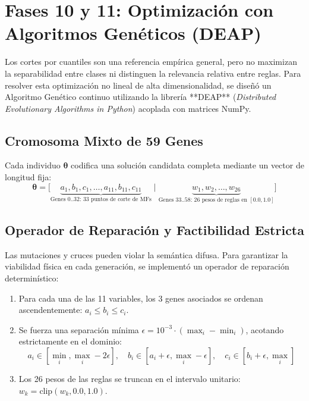 \documentclass[11pt,a4paper]{article}
\begin{document}
\section{Fases 10 y 11: Optimización con Algoritmos Genéticos (DEAP)}

Los cortes por cuantiles son una referencia empírica general, pero no maximizan la separabilidad entre clases ni distinguen la relevancia relativa entre reglas. Para resolver esta optimización no lineal de alta dimensionalidad, se diseñó un Algoritmo Genético continuo utilizando la librería **DEAP** (\textit{Distributed Evolutionary Algorithms in Python}) acoplada con matrices NumPy.

\subsection{Cromosoma Mixto de 59 Genes}
Cada individuo $\boldsymbol{\theta}$ codifica una solución candidata completa mediante un vector de longitud fija:
\begin{equation}
\boldsymbol{\theta} = \big[ \underbrace{a_1, b_1, c_1, \dots, a_{11}, b_{11}, c_{11}}_{\text{Genes 0..32: 33 puntos de corte de MFs}} \;\big\vert\; \underbrace{w_1, w_2, \dots, w_{26}}_{\text{Genes 33..58: 26 pesos de reglas en } [0.0, 1.0]} \big]
\end{equation}

\subsection{Operador de Reparación y Factibilidad Estricta}
Las mutaciones y cruces pueden violar la semántica difusa. Para garantizar la viabilidad física en cada generación, se implementó un operador de reparación determinístico:
\begin{enumerate}[noitemsep]
    \item Para cada una de las 11 variables, los 3 genes asociados se ordenan ascendentemente: $a_i \le b_i \le c_i$.
    \item Se fuerza una separación mínima $\epsilon = 10^{-3} \cdot (\max_i - \min_i)$, acotando estrictamente en el dominio:
    \begin{equation}
    a_i \in [\min_i, \max_i - 2\epsilon], \quad b_i \in [a_i + \epsilon, \max_i - \epsilon], \quad c_i \in [b_i + \epsilon, \max_i]
    \end{equation}
    \item Los 26 pesos de las reglas se truncan en el intervalo unitario: $w_k = \text{clip}(w_k, 0.0, 1.0)$.
\end{enumerate}
\end{document}
